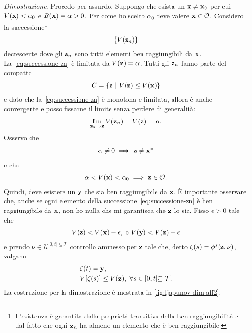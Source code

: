 \begin{steps}
    \emph{Dimostrazione}.
    Procedo per assurdo.
    Suppongo che esista un $\mathbf{x} \neq \mathbf{x}_0$ per cui $V(\mathbf{x}) < \alpha_0$
    e $B(\mathbf{x}) = \alpha > 0$.
    Per come ho scelto $\alpha_0$ deve valere $\mathbf{x} \in \mathcal O$.
    Considero la successione\footnote{L'esistenza
    è garantita dalla proprietà transitiva della ben raggiungibilità e dal fatto che
    ogni $\mathbf{z}_n$ ha almeno un elemento che è ben raggiungibile.}
    \begin{equation}
        \{V(\mathbf{z}_n)\}
        \label{eq:successione-zn}
    \end{equation}
    decrescente dove gli $\mathbf{z}_n$ sono tutti elementi ben raggiungibili da $\mathbf{x}$.
    La~\eqref{eq:successione-zn} è limitata da $V(\mathbf{z}) = \alpha$.
    Tutti gli $\mathbf{z}_n$ fanno parte del compatto
    \begin{equation*}
        C = \left\{\mathbf{z} \ |\ V(\mathbf{z}) \leq V(\mathbf{x}) \right\}
    \end{equation*}
    e dato che la~\eqref{eq:successione-zn} è monotona e limitata,
    allora è anche convergente e posso fissarne il limite senza perdere
    di generalità:
    \begin{equation}
        \lim_{\mathbf{z}_n \to \mathbf{z}} V(\mathbf{z}_n) = V(\mathbf{z}) = \alpha.
        \label{eq:vzequalsalpha}
    \end{equation}
    Osservo che
    \begin{equation*}
        \alpha \neq 0 \implies \mathbf{z} \neq \mathbf{x}^*
    \end{equation*}
    e che
    \begin{equation*}
        \alpha < V(\mathbf{x}) < \alpha_0 \implies \mathbf{z} \in \mathcal O.
    \end{equation*}
    Quindi, deve esistere un $\mathbf{y}$ che sia ben raggiungibile da $\mathbf{z}$.
    È importante osservare che, anche se ogni elemento della successione~\eqref{eq:successione-zn}
    è ben raggiungibile da $\mathbf{x}$, non ho nulla che mi garantisca che $\mathbf{z}$ lo sia.
    Fisso $\epsilon > 0$ tale che
    \begin{equation}
        V(\b z) < V(\b x) - \epsilon,\ \text{e} \ V(\b y) < V(\b z) - \epsilon
        \label{eq:vy-less-vz}
    \end{equation}
    e prendo $\nu \in \mathcal U^{[0, t[ \subseteq \mathcal T}$ controllo ammesso
    per $\mathbf{z}$ tale che, detto $\zeta(s) = \phi^s(\mathbf{z}, \nu)$, valgano
    \begin{align*}
        &\zeta(t) = \mathbf{y}, \\
        &V[\zeta(s)] \leq V(\mathbf{z}), \ \forall s \in [0, t[ \subseteq \mathcal T.
    \end{align*}
    La costruzione per la dimostrazione è mostrata in \autoref{fig:ljapunov-dim-aff2}.


\end{steps}

